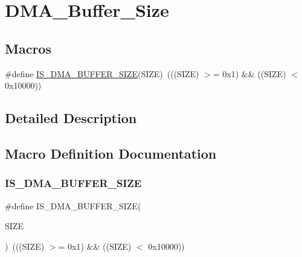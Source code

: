 \hypertarget{group___d_m_a___buffer___size}{}\section{D\+M\+A\+\_\+\+Buffer\+\_\+\+Size}
\label{group___d_m_a___buffer___size}
\subsection*{Macros}
\begin{DoxyCompactItemize}
\item 
\#define \mbox{\hyperlink{group___d_m_a___buffer___size_ga72ef4033bb3bc2cdfdbe579083b05e32}{I\+S\+\_\+\+D\+M\+A\+\_\+\+B\+U\+F\+F\+E\+R\+\_\+\+S\+I\+ZE}}(S\+I\+ZE)~(((S\+I\+ZE) $>$= 0x1) \&\& ((\+S\+I\+Z\+E) $<$ 0x10000))
\end{DoxyCompactItemize}


\subsection{Detailed Description}


\subsection{Macro Definition Documentation}
\mbox{\label{group___d_m_a___buffer___size_ga72ef4033bb3bc2cdfdbe579083b05e32}} 
\subsubsection{\texorpdfstring{IS\_DMA\_BUFFER\_SIZE}{IS\_DMA\_BUFFER\_SIZE}}
{\footnotesize\ttfamily \#define I\+S\+\_\+\+D\+M\+A\+\_\+\+B\+U\+F\+F\+E\+R\+\_\+\+S\+I\+ZE(\begin{DoxyParamCaption}\item[{}]{S\+I\+ZE }\end{DoxyParamCaption})~(((S\+I\+ZE) $>$= 0x1) \&\& ((\+S\+I\+Z\+E) $<$ 0x10000))}

